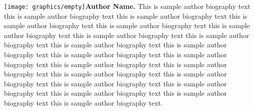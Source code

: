 \documentclass[AMS,STIX1COL]{WileyNJD-v2}
\begin{document}
\begin{biography}{\texttt{[image: graphics/empty]}}{\textbf{Author Name.} This is sample author biography text this is sample author biography text this is sample author biography text this is sample author biography text this is sample author biography text this is sample author biography text this is sample author biography text this is sample author biography text this is sample author biography text this is sample author biography text this is sample author biography text this is sample author biography text this is sample author biography text this is sample author biography text this is sample author biography text this is sample author biography text this is sample author biography text this is sample author biography text this is sample author biography text this is sample author biography text this is sample author biography text.}
\end{biography}
\end{document}
